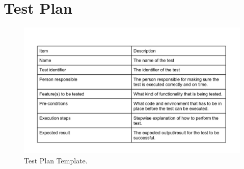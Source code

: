 \section{Test Plan}
\begin{figure}[hthp]
\begin{center}
\includegraphics[width = \textwidth/3*2]{Appendix/testplanTemp.jpg}
\caption{Test Plan Template.}
\label{TestPlanTemplate}
\end{center}
\end{figure}
\newpage

